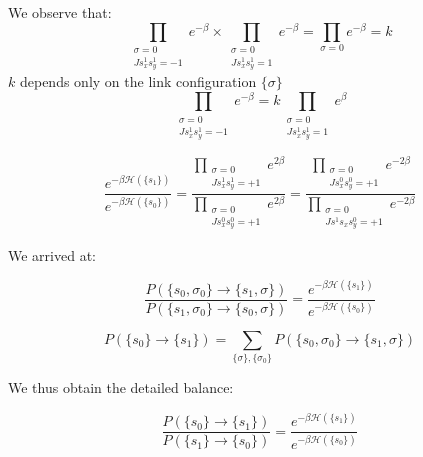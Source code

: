 \documentclass[12pt,handout]{beamer}
\begin{document}
\begin{frame}
\begin{center}
We observe that: 
\[
\prod_{\substack{\sigma = 0 \\ J s^1_x s^1_y = -1}} e^{-\beta} \times \prod_{\substack{\sigma = 0 \\ J s^1_x s^1_y = 1}} e^{-\beta} = \prod_{\sigma = 0} e^{-\beta} = k
\] $k$ depends only on the link configuration $\lbrace \sigma \rbrace$\\

\[
\prod_{\substack{\sigma = 0 \\ J s^1_x s^1_y = -1}} e^{-\beta} = k \prod_{\substack{\sigma = 0 \\ J s^1_x s^1_y = 1}} e^{\beta} 
\]

\[
\frac{e^{- \beta \mathcal{H} \left( \lbrace s_1 \rbrace \right)}}{e^{- \beta \mathcal{H} \left( \lbrace s_0 \rbrace \right)}} = \frac{\prod_{\substack{\sigma = 0 \\ J s^1_x s^1_y = +1}} e^{2 \beta}} { \prod_{\substack{\sigma = 0 \\ J s^0_x s^0_y = +1}} e^{2 \beta}} = \frac{\prod_{\substack{\sigma = 0 \\ J s^0_x s^0_y = +1}} e^{-2 \beta}} { \prod_{\substack{\sigma = 0 \\ J s^1s_x s^0_y = +1}} e^{-2 \beta}}
\]

\end{center}
\end{frame}


\begin{frame}
\begin{center}

We arrived at:

\[
\frac{P \left( \lbrace s_0, \sigma_0 \rbrace \rightarrow \lbrace s_1, \sigma \rbrace \right)}{ P \left( \lbrace s_1, \sigma_0 \rbrace \rightarrow \lbrace s_0, \sigma \rbrace \right)} = \frac{e^{- \beta \mathcal{H} \left( \lbrace s_1 \rbrace \right)}}{e^{- \beta \mathcal{H} \left( \lbrace s_0 \rbrace \right)}}
\]

\[
P \left( \lbrace s_0 \rbrace \rightarrow \lbrace s_1\rbrace \right) = \sum_{\lbrace \sigma \rbrace, \lbrace \sigma_0 \rbrace} P \left( \lbrace s_0, \sigma_0 \rbrace \rightarrow \lbrace s_1, \sigma \rbrace \right)
\]

We thus obtain the detailed balance:

{ \Large
\[
\frac{P \left( \lbrace s_0 \rbrace \rightarrow \lbrace s_1\rbrace \right)}{P \left( \lbrace s_1 \rbrace \rightarrow \lbrace s_0\rbrace \right)} = \frac{e^{- \beta \mathcal{H} \left( \lbrace s_1 \rbrace \right)}}{e^{- \beta \mathcal{H} \left( \lbrace s_0 \rbrace \right)}}
\]
}

\end{center}
\end{frame}
\end{document}
